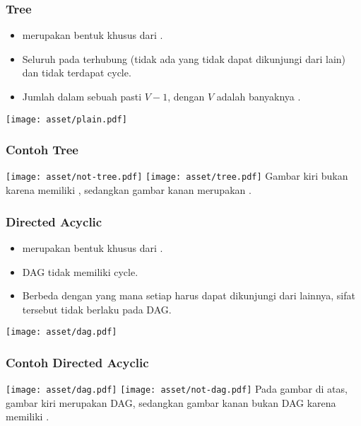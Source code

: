 \begin{frame}
\frametitle{Tree}
\begin{itemize}
  \item \fTree merupakan bentuk khusus dari \fgraph.
  \item Seluruh \fnode pada \ftree terhubung (tidak ada \fnode yang tidak dapat dikunjungi dari \fnode lain) dan tidak terdapat \alert{cycle}.
  \item Jumlah \fedge dalam sebuah \ftree pasti $V-1$, dengan $V$ adalah banyaknya \fnode.
\end{itemize}
\begin{center}
  \texttt{[image: asset/plain.pdf]}
\end{center}
\end{frame}

\begin{frame}
\frametitle{Contoh Tree}
\texttt{[image: asset/not-tree.pdf]}
\hspace{\fill}
\texttt{[image: asset/tree.pdf]}
\newline\newline
Gambar kiri bukan \ftree karena memiliki , sedangkan gambar kanan merupakan \ftree. 
\end{frame}

\begin{frame}
\frametitle{Directed Acyclic \fGraph}
\begin{itemize}
  \item {} merupakan bentuk khusus dari  \fgraph.
  \item DAG tidak memiliki \alert{cycle}.
  \item Berbeda dengan \ftree yang mana setiap \fnode harus dapat dikunjungi dari \fnode lainnya, sifat tersebut tidak berlaku pada DAG.
\end{itemize}
\begin{center}
  \texttt{[image: asset/dag.pdf]}
\end{center}
\end{frame}

\begin{frame}
\frametitle{Contoh Directed Acyclic \fGraph}
\texttt{[image: asset/dag.pdf]}
\hspace{\fill}
\texttt{[image: asset/not-dag.pdf]}
\newline\newline
Pada gambar di atas, gambar kiri merupakan DAG, sedangkan gambar kanan bukan DAG karena memiliki .
\end{frame}

